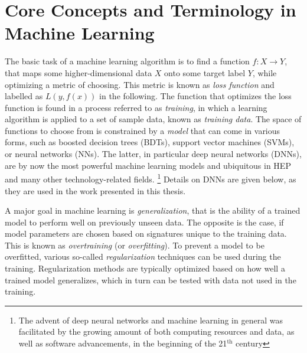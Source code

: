 \section{Core Concepts and Terminology in Machine Learning}
The basic task of a machine learning algorithm is to find a function $f: X \rightarrow Y$, that maps some higher-dimensional data $X$ onto some target label $Y$, while optimizing a metric of choosing.
This metric is known as \emph{loss function} and labelled as $L(y, f(x))$ in the following.
The function that optimizes the loss function is found in a process referred to as \emph{training}, in which a learning algorithm is applied to a set of sample data, known as \emph{training data}.
The space of functions to choose from is constrained by a \emph{model} that can come in various forms, such as boosted decision trees (BDTs), support vector machines (SVMs), or neural networks (NNs). The latter, in particular deep neural networks (DNNs), are by now the most powerful machine learning models and ubiquitous in HEP and many other technology-related fields.  \footnote{The advent of deep neural networks and machine learning in general was facilitated by the growing amount of both computing resources and data, as well as software advancements, in the beginning of the 21$^{\text{th}}$ century}
Details on DNNs are given below, as they are used in the work presented in this thesis.



A major goal in machine learning is \emph{generalization}, that is the ability of a trained model to perform well on previously unseen data.
The opposite is the case, if model parameters are chosen based on signatures unique to the training data. This is known as \emph{overtraining} (or \emph{overfitting}). To prevent a model to be overfitted, various so-called \emph{regularization} techniques can be used during the training.
Regularization methods are typically optimized based on how well a trained model generalizes, which in turn can be tested with data not used in the training.



